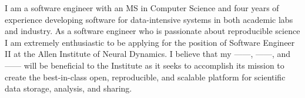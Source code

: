 I am a software engineer with an MS in Computer Science and four years of experience developing software for data-intensive systems in both academic labs and industry.
As a software engineer who is passionate about reproducible science I am extremely enthusiastic to be applying for the position of Software Engineer II at the Allen Institute of Neural Dynamics.
I believe that my ——, ——, and —— will be beneficial to the Institute as it seeks to accomplish its mission to create the best-in-class open, reproducible, and scalable platform for scientific data storage, analysis, and sharing.

